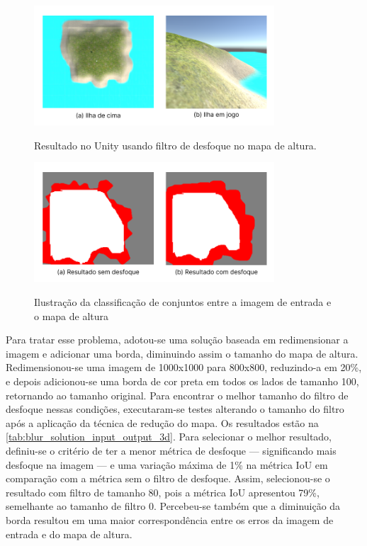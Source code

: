 \begin{figure}[!ht]
	\centering
    \caption{Resultado no Unity usando filtro de desfoque no mapa de altura.}
	\includegraphics[width=0.8\textwidth]{figures/Unity_blur.png}
	\label{fig:Unity_blur}
\end{figure}



\begin{figure}[!ht]
	\centering
    \caption{Ilustração da classificação de conjuntos entre a imagem de entrada e o mapa de altura}
	\includegraphics[width=0.8\textwidth]{figures/comparacao_blur.png}
	\label{fig:comparando_blur}
\end{figure}

Para tratar esse problema, adotou-se uma solução baseada em redimensionar a imagem e adicionar uma borda, diminuindo assim o tamanho do mapa de altura. Redimensionou-se uma imagem de 1000x1000 para 800x800, reduzindo-a em 20\%, e depois adicionou-se uma borda de cor preta em todos os lados de tamanho 100, retornando ao tamanho original. Para encontrar o melhor tamanho do filtro de desfoque nessas condições, executaram-se testes alterando o tamanho do filtro após a aplicação da técnica de redução do mapa. Os resultados estão na \cref{tab:blur_solution_input_output_3d}. Para selecionar o melhor resultado, definiu-se o critério de ter a menor métrica de desfoque — significando mais desfoque na imagem — e uma variação máxima de 1\% na métrica IoU em comparação com a métrica sem o filtro de desfoque. Assim, selecionou-se o resultado com filtro de tamanho 80, pois a métrica IoU apresentou 79\%, semelhante ao tamanho de filtro 0. Percebeu-se também que a diminuição da borda resultou em uma maior correspondência entre os erros da imagem de entrada e do mapa de altura.

